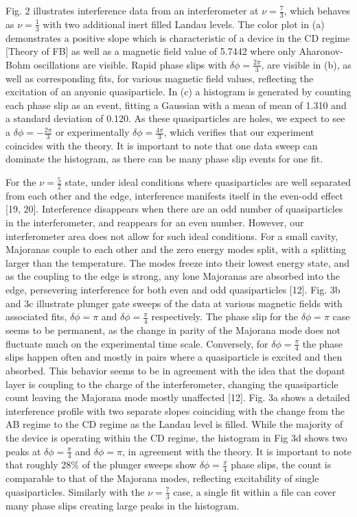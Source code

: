 \documentclass[]{article}
\begin{document}
	Fig. 2 illustrates interference data from an interferometer at $\nu = \frac{7}{3}$, which behaves as $\nu = \frac{1}{3}$ with two additional inert filled Landau levels. The color plot in (a) demonstrates a positive slope which is characteristic of a device in the CD regime [Theory of FB] as well as a magnetic field value of 5.7442 where only Aharonov-Bohm oscillations are visible. Rapid phase slips with $\delta\phi = \frac{2\pi}{3}$, are visible in (b), as well as corresponding fits, for various magnetic field values, reflecting the excitation of an anyonic quasiparticle. In (c) a histogram is generated by counting each phase slip as an event, fitting a Gaussian with a mean of mean of 1.310 and a standard deviation of 0.120. As these quasiparticles are holes, we expect to see a $\delta\phi = -\frac{2\pi}{3}$ or experimentally $\delta\phi = \frac{4\pi}{3}$, which verifies that our experiment coincides with the theory. It is important to note that one data sweep can dominate the histogram, as there can be many phase slip events for one fit.
	 
	For the $\nu = \frac{5}{2}$ state, under ideal conditions where quasiparticles are well separated from each other and the edge, interference manifests itself in the even-odd effect [19, 20]. Interference disappears when there are an odd number of quasiparticles in the interferometer, and reappears for an even number. However, our interferometer area does not allow for such ideal conditions. For a small cavity, Majoranas couple to each other and the zero energy modes split, with a splitting larger than the temperature. The modes freeze into their lowest energy state, and as the coupling to the edge is strong, any lone Majoranas are absorbed into the edge, persevering interference for both even and odd quasiparticles [12].  
	Fig. 3b and 3c illustrate plunger gate sweeps of the data at various magnetic fields with associated fits, $\delta\phi = \pi$ and $\delta\phi = \frac{\pi}{4}$ respectively. The phase slip for the $\delta\phi = \pi$ case seems to be permanent, as the change in parity of the Majorana mode does not fluctuate much on the experimental time scale. Conversely, for $\delta\phi = \frac{\pi}{4}$ the phase slips happen often and mostly in pairs where a quasiparticle is excited and then absorbed. This behavior seems to be in agreement with the idea that the dopant layer is coupling to the charge of the interferometer, changing the quasiparticle count leaving the Majorana mode mostly unaffected [12]. Fig. 3a shows a detailed interference profile with two separate slopes coinciding with the change from the AB regime to the CD regime as the Landau level is filled. While the majority of the device is operating within the CD regime, the histogram in Fig 3d shows two peaks at $\delta\phi = \frac{\pi}{4}$ and $\delta\phi = \pi$, in agreement with the theory. It is important to note that roughly 28\% of the plunger sweeps show $\delta\phi = \frac{\pi}{4}$ phase slips, the count is comparable to that of the Majorana modes, reflecting excitability of single quasiparticles. Similarly with the $\nu = \frac{7}{3}$ case, a single fit within a file can cover many phase slips creating large peaks in the histogram. 
	 
\end{document}
